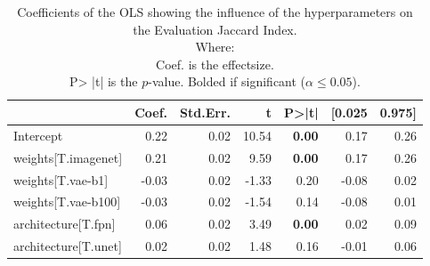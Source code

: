 \begin{table}
    \centering
    \caption{Coefficients of the OLS showing the influence of the hyperparameters on the Evaluation Jaccard Index.\\Where:\\\hphantom{tabb}Coef. is the effectsize.\\\hphantom{tabb}P> |t| is the $p$-value. Bolded if significant ($\alpha\le0.05$).}
    \label{tab:comparison_baselines_ols_effects}
    \begin{tabular}{lrrrrrr}
        \toprule
                             & Coef. & Std.Err. & t     & P>|t|         & [0.025 & 0.975] \\
        \midrule
        Intercept            & 0.22  & 0.02     & 10.54 & \textbf{0.00} & 0.17   & 0.26   \\
        weights[T.imagenet]  & 0.21  & 0.02     & 9.59  & \textbf{0.00} & 0.17   & 0.26   \\
        weights[T.vae-b1]    & -0.03 & 0.02     & -1.33 & 0.20          & -0.08  & 0.02   \\
        weights[T.vae-b100]  & -0.03 & 0.02     & -1.54 & 0.14          & -0.08  & 0.01   \\
        architecture[T.fpn]  & 0.06  & 0.02     & 3.49  & \textbf{0.00} & 0.02   & 0.09   \\
        architecture[T.unet] & 0.02  & 0.02     & 1.48  & 0.16          & -0.01  & 0.06   \\
        \bottomrule
    \end{tabular}
\end{table}
